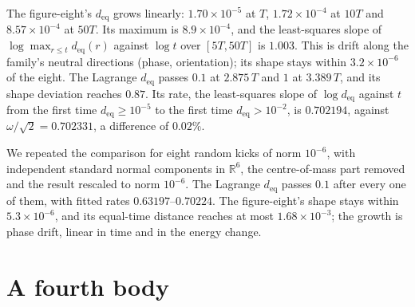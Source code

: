 \documentclass[11pt]{article}
\theoremstyle{definition}\newtheorem{definition}[theorem]{Definition}
\theoremstyle{remark}\newtheorem{remark}[theorem]{Remark}
\newcommand{\R}{\mathbb R}\newcommand{\C}{\mathbb C}\newcommand{\N}{\mathbb N}
\begin{document}
The figure-eight's $d_{\mathrm{eq}}$ grows linearly: $1.70\times10^{-5}$ at $T$, $1.72\times10^{-4}$ at $10T$ and $8.57\times10^{-4}$ at $50T$. Its maximum is $8.9\times10^{-4}$, and the least-squares slope of $\log\max_{r\le t}d_{\mathrm{eq}}(r)$ against $\log t$ over $[5T,50T]$ is $1.003$. This is drift along the family's neutral directions (phase, orientation); its shape stays within $3.2\times10^{-6}$ of the eight. The Lagrange $d_{\mathrm{eq}}$ passes $0.1$ at $2.875\,T$ and $1$ at $3.389\,T$, and its shape deviation reaches $0.87$. Its rate, the least-squares slope of $\log d_{\mathrm{eq}}$ against $t$ from the first time $d_{\mathrm{eq}}\ge10^{-5}$ to the first time $d_{\mathrm{eq}}>10^{-2}$, is $0.702194$, against $\omega/\sqrt2=0.702331$, a difference of $0.02\%$.

We repeated the comparison for eight random kicks of norm $10^{-6}$, with independent standard normal components in $\R^6$, the centre-of-mass part removed and the result rescaled to norm $10^{-6}$. The Lagrange $d_{\mathrm{eq}}$ passes $0.1$ after every one of them, with fitted rates $0.63197$--$0.70224$. The figure-eight's shape stays within $5.3\times10^{-6}$, and its equal-time distance reaches at most $1.68\times10^{-3}$; the growth is phase drift, linear in time and in the energy change.

\section{A fourth body}\label{sec:fourth}
\end{document}
